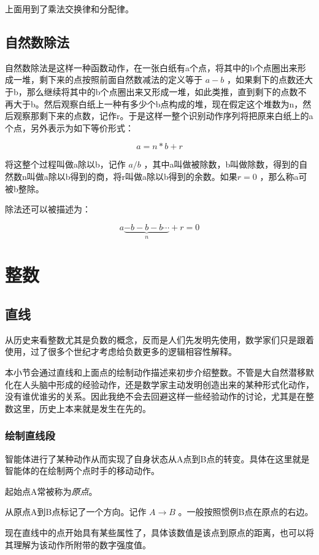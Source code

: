 \documentclass[12pt,oneside]{book}
\begin{document}
上面用到了乘法交换律和分配律。

\section{自然数除法}
自然数除法是这样一种函数动作，在一张白纸有a个点，将其中的b个点圈出来形成一堆，剩下来的点按照前面自然数减法的定义等于 $a-b$ ，如果剩下的点数还大于b，那么继续将其中的b个点圈出来又形成一堆，如此类推，直到剩下的点数不再大于b。然后观察白纸上一种有多少个b点构成的堆，现在假定这个堆数为n，然后观察那剩下来的点数，记作r。于是这样一整个识别动作序列将把原来白纸上的a个点，另外表示为如下等价形式：

\[
a = n*b + r
\]

将这整个过程叫做a除以b，记作 $a/b$ ，其中a叫做被除数，b叫做除数，得到的自然数n叫做a除以b得到的商，将r叫做a除以b得到的余数。如果$r=0$ ，那么称a可被b整除。

除法还可以被描述为：

\begin{equation}
a \underbrace{- b - b -b  \cdots}_{n} + r = 0
\end{equation}



\chapter{整数}
\section{直线}
从历史来看整数尤其是负数的概念，反而是人们先发明先使用，数学家们只是跟着使用，过了很多个世纪才考虑给负数更多的逻辑相容性解释\cite{高观点下的初等数学第一卷}。

本小节会通过直线和上面点的绘制动作描述来初步介绍整数。不管是大自然潜移默化在人头脑中形成的经验动作，还是数学家主动发明创造出来的某种形式化动作，没有谁优谁劣的关系。因此我绝不会去回避这样一些经验动作的讨论，尤其是在整数这里，历史上本来就是发生在先的。


\subsection{绘制直线段}
智能体进行了某种动作从而实现了自身状态从A点到B点的转变。具体在这里就是智能体的在绘制两个点时手的移动动作。

起始点A常被称为\emph{原点}。

从原点A到B点标记了一个方向。记作 $A \to B$ 。一般按照惯例B点在原点的右边。

现在直线中的点开始具有某些属性了，具体该数值是该点到原点的距离，也可以将其理解为该动作所附带的数字强度值。
\end{document}

